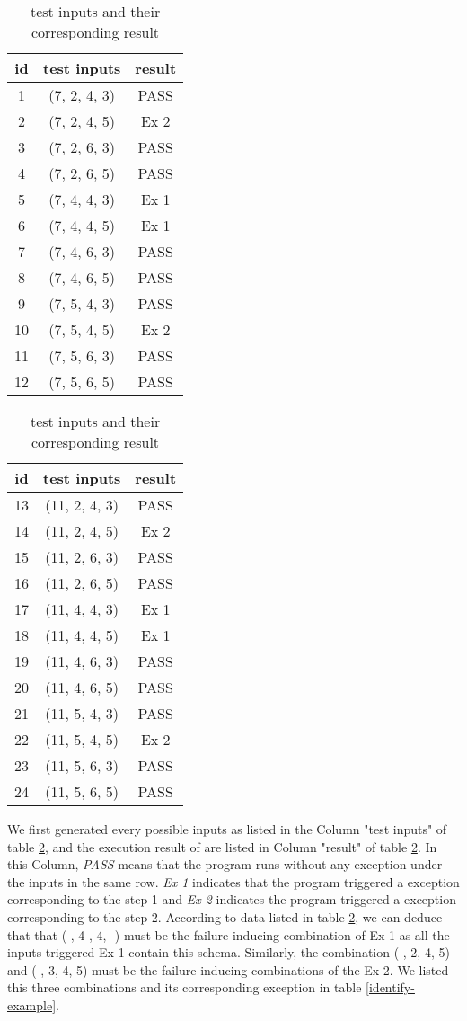 \documentclass{sig-alternate}
\begin{document}
\begin{table}[!ht]
  \caption{test inputs and their corresponding result}\label{test-example}
  \centering
  \begin{tabular}{ccc}
id&test inputs & result\\\hline
1&(7, 2, 4, 3) &  PASS\\ \hline
2&(7, 2, 4, 5) &  Ex 2\\ \hline
3&(7, 2, 6, 3) &  PASS\\ \hline
4&(7, 2, 6, 5) &  PASS\\ \hline
5&(7, 4, 4, 3) &  Ex 1\\ \hline
6&(7, 4, 4, 5) &  Ex 1\\ \hline
7&(7, 4, 6, 3) &  PASS\\ \hline
8&(7, 4, 6, 5) &  PASS\\ \hline
9&(7, 5, 4, 3) &  PASS\\ \hline
10&(7, 5, 4, 5) &  Ex 2\\ \hline
11&(7, 5, 6, 3) &  PASS\\ \hline
12&(7, 5, 6, 5) &  PASS\\ \hline
  \end{tabular}
  \hspace{1em}
  \begin{tabular}{ccc}
id&test inputs & result\\\hline
13&(11, 2, 4, 3)& PASS\\ \hline
14&(11, 2, 4, 5)& Ex 2\\ \hline
15&(11, 2, 6, 3)& PASS\\ \hline
16&(11, 2, 6, 5)& PASS\\ \hline
17&(11, 4, 4, 3)& Ex 1\\ \hline
18&(11, 4, 4, 5)& Ex 1\\ \hline
19&(11, 4, 6, 3)& PASS\\ \hline
20&(11, 4, 6, 5)& PASS\\ \hline
21&(11, 5, 4, 3)& PASS\\ \hline
22&(11, 5, 4, 5)& Ex 2\\ \hline
23&(11, 5, 6, 3)& PASS\\ \hline
24&(11, 5, 6, 5)& PASS\\ \hline
  \end{tabular}
  \end{table}

We first generated every possible inputs as listed in the Column "test inputs" of table \ref{test-example}, and the execution result of are listed in Column "result" of table \ref{test-example}. In this Column, \emph{PASS} means that the program runs without any exception under the inputs in the same row. \emph{Ex 1} indicates that the program triggered a exception corresponding to the step 1 and \emph{Ex 2} indicates the program triggered a exception corresponding to the step 2. According to data listed in table \ref{test-example}, we can deduce that that (-, 4 , 4, -) must be the failure-inducing combination of Ex 1 as all the inputs triggered Ex 1 contain this schema. Similarly, the combination (-, 2, 4, 5) and  (-, 3, 4, 5) must be the failure-inducing combinations of the Ex 2. We listed this three combinations and its corresponding exception in table \ref{identify-example}.
\end{document}
